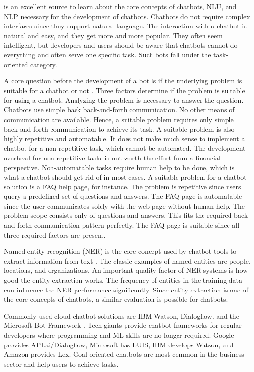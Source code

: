 \citet{buiildChatbotsPython} is an excellent source to learn about the core concepts of chatbots, NLU, and NLP necessary for the development of chatbots.
Chatbots do not require complex interfaces since they support natural language.
The interaction with a chatbot is natural and easy, and they get more and more popular.
They often seem intelligent, but developers and users should be aware that chatbots cannot do everything and often serve one specific task.
Such bots fall under the task-oriented category.

A core question before the development of a bot is if the underlying problem is suitable for a chatbot or not \cite{buiildChatbotsPython}.
Three factors determine if the problem is suitable for using a chatbot.
Analyzing the problem is necessary to answer the question.
Chatbots use simple back back-and-forth communication.
No other means of communication are available.
Hence, a suitable problem requires only simple back-and-forth communication to achieve its task.
A suitable problem is also highly repetitive and automatable.
It does not make much sense to implement a chatbot for a non-repetitive task, which cannot be automated.
The development overhead for non-repetitive tasks is not worth the effort from a financial perspective.
Non-automatable tasks require human help to be done, which is what a chatbot should get rid of in most cases.
A suitable problem for a chatbot solution is a FAQ help page, for instance.
The problem is repetitive since users query a predefined set of questions and answers.
The FAQ page is automatable since the user communicates solely with the web-page without human help.
The problem scope consists only of questions and answers.
This fits the required back-and-forth communication pattern perfectly.
The FAQ page is suitable since all three required factors are present.


Named entity recognition (NER) is the core concept used by chatbot tools to extract information from text \cite{geyer2016named}.
The classic examples of named entities are people, locations, and organizations.
An important quality factor of NER systems is how good the entity extraction works.
The frequency of entities in the training data can influence the NER performance significantly. 
Since entity extraction is one of the core concepts of chatbots, a similar evaluation is possible for chatbots.

Commonly used cloud chatbot solutions are IBM Watson, Dialogflow, and the Microsoft Bot Framework \cite{rahman2017programming}.
Tech giants provide chatbot frameworks for regular developers where programming and ML skills are no longer required.
Google provides API.ai/Dialogflow, Microsoft has LUIS, IBM develops Watson, and Amazon provides Lex.
Goal-oriented chatbots are most common in the business sector and help users to achieve tasks.

